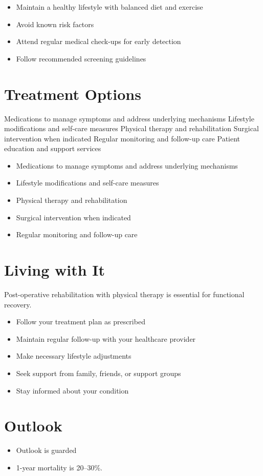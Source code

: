 \begin{itemize}[noitemsep]
  \item Maintain a healthy lifestyle with balanced diet and exercise
  \item Avoid known risk factors
  \item Attend regular medical check-ups for early detection
  \item Follow recommended screening guidelines
\end{itemize}
\section{Treatment Options}
Medications to manage symptoms and address underlying mechanisms Lifestyle modifications and self-care measures Physical therapy and rehabilitation Surgical intervention when indicated Regular monitoring and follow-up care Patient education and support services

\begin{itemize}[noitemsep]
  \item Medications to manage symptoms and address underlying mechanisms
  \item Lifestyle modifications and self-care measures
  \item Physical therapy and rehabilitation
  \item Surgical intervention when indicated
  \item Regular monitoring and follow-up care
\end{itemize}
\section{Living with It}
Post-operative rehabilitation with physical therapy is essential for functional recovery.

\begin{itemize}[noitemsep]
  \item Follow your treatment plan as prescribed
  \item Maintain regular follow-up with your healthcare provider
  \item Make necessary lifestyle adjustments
  \item Seek support from family, friends, or support groups
  \item Stay informed about your condition
\end{itemize}
\section{Outlook}
\begin{itemize}[noitemsep]
  \item Outlook is guarded
  \item 1-year mortality is 20--30\%.
\end{itemize}
